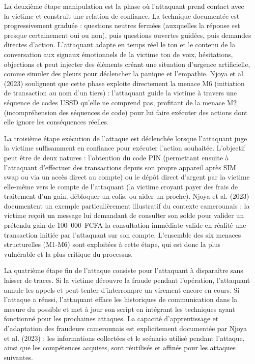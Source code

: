 \documentclass[11pt,a4paper,oneside]{report}
\theoremstyle{definition}
\theoremstyle{remark}
\begin{document}
La deuxième étape  manipulation  est la phase où l'attaquant prend contact avec la victime et construit une relation de confiance. La technique documentée est progressivement graduée : questions neutres fermées (auxquelles la réponse est presque certainement oui ou non), puis questions ouvertes guidées, puis demandes directes d'action. L'attaquant adapte en temps réel le ton et le contenu de la conversation aux signaux émotionnels de la victime  ton de voix, hésitations, objections  et peut injecter des éléments créant une situation d'urgence artificielle, comme simuler des pleurs pour déclencher la panique et l'empathie. Njoya et al. (2023) soulignent que cette phase exploite directement la menace M6 (initiation de transaction au nom d'un tiers) : l'attaquant guide la victime à travers une séquence de codes USSD qu'elle ne comprend pas, profitant de la menace M2 (incompréhension des séquences de code) pour lui faire exécuter des actions dont elle ignore les conséquences réelles.

La troisième étape  exécution de l'attaque  est déclenchée lorsque l'attaquant juge la victime suffisamment en confiance pour exécuter l'action souhaitée. L'objectif peut être de deux natures : l'obtention du code PIN (permettant ensuite à l'attaquant d'effectuer des transactions depuis son propre appareil après SIM swap ou via un accès direct au compte) ou le dépôt direct d'argent par la victime elle-même vers le compte de l'attaquant (la victime croyant payer des frais de traitement d'un gain, débloquer un colis, ou aider un proche). Njoya et al. (2023) documentent un exemple particulièrement illustratif du contexte camerounais : la victime reçoit un message lui demandant de consulter son solde pour valider un prétendu gain de 100~000~FCFA  la consultation immédiate valide en réalité une transaction initiée par l'attaquant sur son compte. L'ensemble des six menaces structurelles (M1-M6) sont exploitées à cette étape, qui est donc la plus vulnérable et la plus critique du processus.

La quatrième étape  fin de l'attaque  consiste pour l'attaquant à disparaître sans laisser de traces. Si la victime découvre la fraude pendant l'opération, l'attaquant annule les appels et peut tenter d'interrompre un virement encore en cours. Si l'attaque a réussi, l'attaquant efface les historiques de communication dans la mesure du possible et met à jour son script en intégrant les techniques ayant fonctionné pour les prochaines attaques. La capacité d'apprentissage et d'adaptation des fraudeurs camerounais est explicitement documentée par Njoya et al. (2023) : les informations collectées et le scénario utilisé pendant l'attaque, ainsi que les compétences acquises, sont réutilisés et affinés pour les attaques suivantes.
\end{document}
